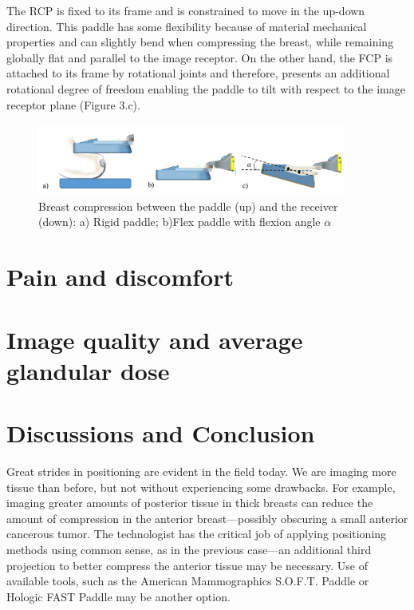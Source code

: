 The RCP is fixed to its frame and is constrained to move in the up-down direction. This paddle has some flexibility because of material mechanical properties and can slightly bend when compressing the breast, while remaining globally flat and parallel to the image receptor. On the other hand, the FCP is attached to its frame by rotational joints and therefore, presents an additional rotational degree of freedom enabling the paddle to tilt with respect to the image receptor plane (Figure 3.c). 

\begin{figure}[!h]
\centering
\includegraphics[width=0.9\textwidth,keepaspectratio]{figures/compressionpaddles.png} 
\caption{Breast compression between the paddle (up) and the receiver (down): a) Rigid paddle; b)Flex paddle with flexion angle $\alpha$}\label{fig:compressionpaddles}
\end{figure}

\section{Pain and discomfort}
\section{Image quality and average glandular dose}


\section{Discussions and Conclusion}\label{section:compression:conclusion}

Great strides in positioning are evident in the field today.
We are imaging more tissue than before, but not without
experiencing some drawbacks. For example, imaging greater
amounts of posterior tissue in thick breasts can reduce the
amount of compression in the anterior breast—possibly
obscuring a small anterior cancerous tumor. The technologist
has the critical job of applying positioning methods using
common sense, as in the previous case—an additional third
projection to better compress the anterior tissue may be necessary.
Use of available tools, such as the American
Mammographics S.O.F.T. Paddle or Hologic FAST Paddle
may be another option.